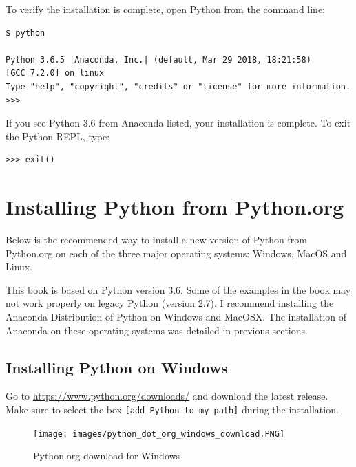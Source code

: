 \documentclass{book}
\begin{document}
To verify the installation is complete, open Python from the command
line:

\begin{lstlisting}
$ python

Python 3.6.5 |Anaconda, Inc.| (default, Mar 29 2018, 18:21:58)
[GCC 7.2.0] on linux
Type "help", "copyright", "credits" or "license" for more information.
>>>
\end{lstlisting}

If you see Python 3.6 from Anaconda listed, your installation is
complete. To exit the Python REPL, type:

\begin{lstlisting}
>>> exit()
\end{lstlisting}
    




    
        \section{Installing Python from
Python.org}\label{installing-python-from-python.org}
    




    
        Below is the recommended way to install a new version of Python from
Python.org on each of the three major operating systems: Windows, MacOS
and Linux.

This book is based on Python version 3.6. Some of the examples in the
book may not work properly on legacy Python (version 2.7). I recommend
installing the Anaconda Distribution of Python on Windows and MacOSX.
The installation of Anaconda on these operating systems was detailed in
previous sections.
    




    
        \subsection{Installing Python on
Windows}\label{installing-python-on-windows}

Go to \url{https://www.python.org/downloads/} and download the latest
release. Make sure to select the box \lstinline![add Python to my path]!
during the installation.

\begin{figure}
\centering
\texttt{[image: images/python\_dot\_org\_windows\_download.PNG]}
\caption{Python.org download for Windows}
\end{figure}
    
\end{document}
